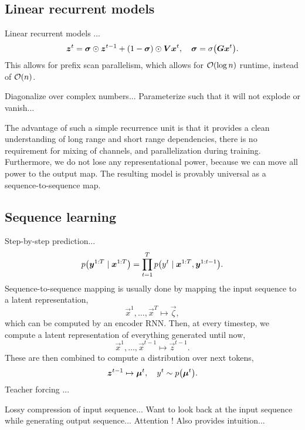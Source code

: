 \subsection{Linear recurrent models}

Linear recurrent models \citep{feng2024were}... \[
    \vec{z}^t = \vec{\sigma} \odot \vec{z}^{t-1} + (1-\vec{\sigma}) \odot \mat{V} \vec{x}^t, \quad \vec{\sigma} = \sigma \lft( \mat{G} \vec{x}^t \rgt).
\]
This allows for prefix scan parallelism, which allows for $\bigo{\log n}$ runtime, instead of
$\bigo{n}$.

Diagonalize over complex numbers... Parameterize such that it will not explode or vanish...

The advantage of such a simple recurrence unit is that it provides a clean understanding of long
range and short range dependencies, there is no requirement for mixing of channels, and
parallelization during training. Furthermore, we do not lose any representational power, because we
can move all power to the output map. The resulting model is provably universal as a
sequence-to-sequence map.

\subsection{Sequence learning}

Step-by-step prediction... \[
    p \lft( \vec{y}^{1:T} \mid \vec{x}^{1:T} \rgt) = \prod_{t=1}^T p \lft( y^t \mid \vec{x}^{1:T}, \vec{y}^{1:t-1} \rgt).
\]
Sequence-to-sequence mapping \citep{sutskever2014sequence} is usually done by mapping the input
sequence to a latent representation, \[
    \vec{x}^1, \ldots, \vec{x}^T \mapsto \vec{\zeta},
\]
which can be computed by an encoder RNN. Then, at every timestep, we compute a latent
representation of everything generated until now, \[
    \vec{x}^{1}, \ldots, \vec{x}^{t-1} \mapsto \vec{z}^{t-1}.
\]
These are then combined to compute a distribution over next tokens, \[
    \vec{z}^{t-1} \mapsto \vec{\mu}^t, \quad y^t \sim p\lft( \vec{\mu}^t \rgt).
\]
Teacher forcing \citep{williams1989learning}...

Lossy compression of input sequence... Want to look back at the input sequence while generating
output sequence... Attention \citep{bahdanau2014neural}! Also provides intuition...

